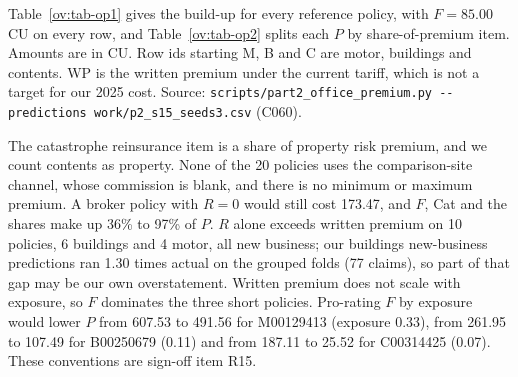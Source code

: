Table~\ref{ov:tab-op1} gives the build-up for every reference policy, with $F = 85.00$ CU on every row, and
Table~\ref{ov:tab-op2} splits each $P$ by share-of-premium item. Amounts are in CU. Row ids starting M, B and C are
motor, buildings and contents. WP is the written premium under the current tariff, which is not a target for our 2025
cost. Source: \texttt{scripts/part2\_office\_premium.py -{}-predictions work/p2\_s15\_seeds3.csv} (C060).

The catastrophe reinsurance item is a share of property risk premium, and we count contents as property. None of the
20 policies uses the comparison-site channel, whose commission is blank, and there is no minimum or maximum premium. A
broker policy with $R = 0$ would still cost 173.47, and $F$, Cat and the shares make up 36\% to 97\% of $P$. $R$ alone
exceeds written premium on 10 policies, 6 buildings and 4 motor, all new business; our buildings new-business
predictions ran 1.30 times actual on the grouped folds (77 claims), so part of that gap may be our own overstatement.
Written premium does not scale with exposure, so $F$ dominates the three short policies. Pro-rating $F$ by exposure
would lower $P$ from 607.53 to 491.56 for M00129413 (exposure 0.33), from 261.95 to 107.49 for B00250679 (0.11) and
from 187.11 to 25.52 for C00314425 (0.07). These conventions are sign-off item R15.

